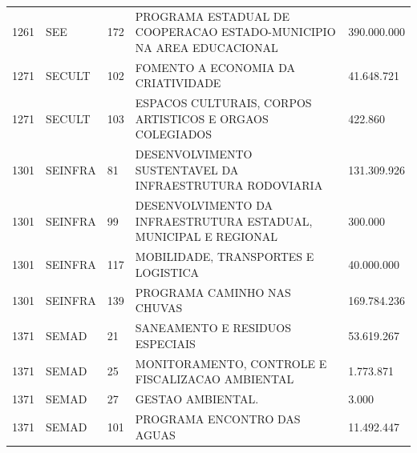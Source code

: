 \documentclass{article}
\begin{document}
\begin{longtable}[c]{m{1cm}|m{1.5cm}|m{1cm}m{10cm}|m{2cm}}
\multicolumn{1}{C{1cm}|}{1261} & \multicolumn{1}{L{1.5cm}|}{SEE} & \multicolumn{1}{C{1cm}|}{172} & \multicolumn{1}{L{10cm}|}{PROGRAMA ESTADUAL DE COOPERACAO ESTADO-MUNICIPIO NA AREA EDUCACIONAL} & \multicolumn{1}{R{2cm}}{390.000.000} \\
\multicolumn{1}{C{1cm}|}{1271} & \multicolumn{1}{L{1.5cm}|}{SECULT} & \multicolumn{1}{C{1cm}|}{102} & \multicolumn{1}{L{10cm}|}{FOMENTO A ECONOMIA DA CRIATIVIDADE} & \multicolumn{1}{R{2cm}}{41.648.721} \\
\multicolumn{1}{C{1cm}|}{1271} & \multicolumn{1}{L{1.5cm}|}{SECULT} & \multicolumn{1}{C{1cm}|}{103} & \multicolumn{1}{L{10cm}|}{ESPACOS CULTURAIS, CORPOS ARTISTICOS E ORGAOS COLEGIADOS} & \multicolumn{1}{R{2cm}}{422.860} \\
\multicolumn{1}{C{1cm}|}{1301} & \multicolumn{1}{L{1.5cm}|}{SEINFRA} & \multicolumn{1}{C{1cm}|}{81} & \multicolumn{1}{L{10cm}|}{DESENVOLVIMENTO SUSTENTAVEL DA INFRAESTRUTURA RODOVIARIA} & \multicolumn{1}{R{2cm}}{131.309.926} \\
\multicolumn{1}{C{1cm}|}{1301} & \multicolumn{1}{L{1.5cm}|}{SEINFRA} & \multicolumn{1}{C{1cm}|}{99} & \multicolumn{1}{L{10cm}|}{DESENVOLVIMENTO DA INFRAESTRUTURA ESTADUAL, MUNICIPAL E REGIONAL} & \multicolumn{1}{R{2cm}}{300.000} \\
\multicolumn{1}{C{1cm}|}{1301} & \multicolumn{1}{L{1.5cm}|}{SEINFRA} & \multicolumn{1}{C{1cm}|}{117} & \multicolumn{1}{L{10cm}|}{MOBILIDADE, TRANSPORTES E LOGISTICA} & \multicolumn{1}{R{2cm}}{40.000.000} \\
\multicolumn{1}{C{1cm}|}{1301} & \multicolumn{1}{L{1.5cm}|}{SEINFRA} & \multicolumn{1}{C{1cm}|}{139} & \multicolumn{1}{L{10cm}|}{PROGRAMA CAMINHO NAS CHUVAS} & \multicolumn{1}{R{2cm}}{169.784.236} \\
\multicolumn{1}{C{1cm}|}{1371} & \multicolumn{1}{L{1.5cm}|}{SEMAD} & \multicolumn{1}{C{1cm}|}{21} & \multicolumn{1}{L{10cm}|}{SANEAMENTO E RESIDUOS ESPECIAIS} & \multicolumn{1}{R{2cm}}{53.619.267} \\
\multicolumn{1}{C{1cm}|}{1371} & \multicolumn{1}{L{1.5cm}|}{SEMAD} & \multicolumn{1}{C{1cm}|}{25} & \multicolumn{1}{L{10cm}|}{MONITORAMENTO, CONTROLE E FISCALIZACAO AMBIENTAL} & \multicolumn{1}{R{2cm}}{1.773.871} \\
\multicolumn{1}{C{1cm}|}{1371} & \multicolumn{1}{L{1.5cm}|}{SEMAD} & \multicolumn{1}{C{1cm}|}{27} & \multicolumn{1}{L{10cm}|}{GESTAO AMBIENTAL.} & \multicolumn{1}{R{2cm}}{3.000} \\
\multicolumn{1}{C{1cm}|}{1371} & \multicolumn{1}{L{1.5cm}|}{SEMAD} & \multicolumn{1}{C{1cm}|}{101} & \multicolumn{1}{L{10cm}|}{PROGRAMA ENCONTRO DAS AGUAS} & \multicolumn{1}{R{2cm}}{11.492.447} \\

\end{longtable}
\end{document}
